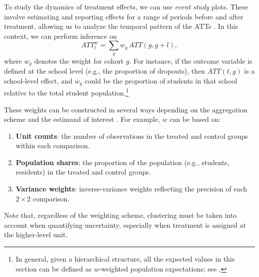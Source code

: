 To study the dynamics of treatment effects, we can use \textit{event study} plots. These involve estimating and reporting effects for a range of periods before and after treatment, allowing us to analyze the temporal pattern of the ATTs \cite{baker2025did_guide}. In this context, we can perform inference on
\[
ATT_l^w = \sum_g w_g \, ATT(g, g+l),
\]
where $w_g$ denotes the weight for cohort $g$. For instance, if the outcome variable is defined at the school level (e.g., the proportion of dropouts), then $ATT(t,g)$ is a school-level effect, and $w_g$ could be the proportion of students in that school relative to the total student population.\footnote{In general, given a hierarchical structure, all the expected values in this section can be defined as $w$-weighted population expectations; see \cite{baker2025did_guide}.}


These weights can be constructed in several ways depending on the aggregation scheme and the estimand of interest \cite{goodman2021difference}. For example, $w$ can be based on:
\begin{enumerate}
	\item \textbf{Unit counts}: the number of observations in the treated and control groups within each comparison.
	\item \textbf{Population shares}: the proportion of the population (e.g., students, residents) in the treated and control groups.
	\item \textbf{Variance weights}: inverse-variance weights reflecting the precision of each $2\times2$ comparison.
\end{enumerate}
Note that, regardless of the weighting scheme, clustering must be taken into account when quantifying uncertainty, especially when treatment is assigned at the higher-level unit.

